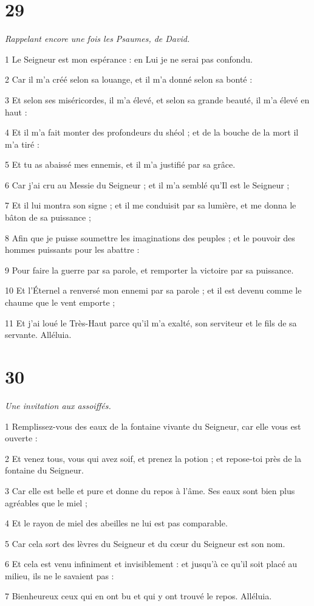 \chapter{29}

\par \textit{Rappelant encore une fois les Psaumes, de David.}

\par 1 Le Seigneur est mon espérance : en Lui je ne serai pas confondu.
\par 2 Car il m'a créé selon sa louange, et il m'a donné selon sa bonté :
\par 3 Et selon ses miséricordes, il m'a élevé, et selon sa grande beauté, il m'a élevé en haut :
\par 4 Et il m'a fait monter des profondeurs du shéol ; et de la bouche de la mort il m'a tiré :
\par 5 Et tu as abaissé mes ennemis, et il m'a justifié par sa grâce.
\par 6 Car j'ai cru au Messie du Seigneur ; et il m'a semblé qu'Il est le Seigneur ;
\par 7 Et il lui montra son signe ; et il me conduisit par sa lumière, et me donna le bâton de sa puissance ;
\par 8 Afin que je puisse soumettre les imaginations des peuples ; et le pouvoir des hommes puissants pour les abattre :
\par 9 Pour faire la guerre par sa parole, et remporter la victoire par sa puissance.
\par 10 Et l'Éternel a renversé mon ennemi par sa parole ; et il est devenu comme le chaume que le vent emporte ;
\par 11 Et j'ai loué le Très-Haut parce qu'il m'a exalté, son serviteur et le fils de sa servante. Alléluia.

\chapter{30}

\par \textit{Une invitation aux assoiffés.}

\par 1 Remplissez-vous des eaux de la fontaine vivante du Seigneur, car elle vous est ouverte :
\par 2 Et venez tous, vous qui avez soif, et prenez la potion ; et repose-toi près de la fontaine du Seigneur.
\par 3 Car elle est belle et pure et donne du repos à l'âme. Ses eaux sont bien plus agréables que le miel ;
\par 4 Et le rayon de miel des abeilles ne lui est pas comparable.
\par 5 Car cela sort des lèvres du Seigneur et du cœur du Seigneur est son nom.
\par 6 Et cela est venu infiniment et invisiblement : et jusqu'à ce qu'il soit placé au milieu, ils ne le savaient pas :
\par 7 Bienheureux ceux qui en ont bu et qui y ont trouvé le repos. Alléluia.


